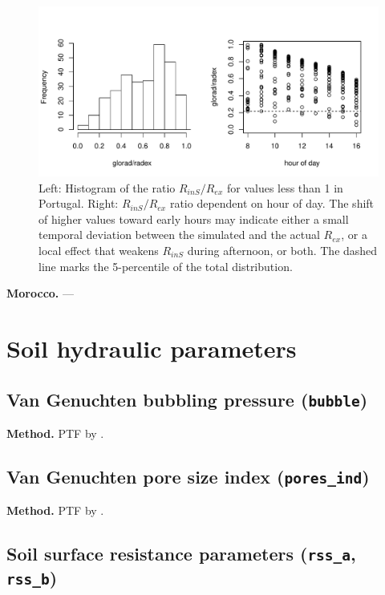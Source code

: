\documentclass{scrreprt}
\begin{document}
\begin{figure}[ht]
  \centering
  \includegraphics[width=0.9\hsize]{./plot_radex.pdf}
  \caption{Left: Histogram of the ratio $R_{inS}/R_{ex}$ for values less than 1 in Portugal.
      Right: $R_{inS}/R_{ex}$ ratio dependent on hour of day.
      The shift of higher values toward early hours may indicate either a small temporal deviation between the simulated and the actual $R_{ex}$, or a local effect that weakens $R_{inS}$ during afternoon, or both.
      The dashed line marks the 5-percentile of the total distribution.}
  \label{fig:portugal_radex}
\end{figure}


\noindent
\textbf{Morocco.}
---

\newpage
\section{Soil hydraulic parameters} \label{sec:parest_soil}

\subsection{Van Genuchten bubbling pressure (\texttt{bubble})} \label{ssec:parest_soil_bubble}

\textbf{Method.}
PTF by \citet{rawls85}.

\newpage
\subsection{Van Genuchten pore size index (\texttt{pores\_ind})} \label{ssec:parest_soil_poresind}

\textbf{Method.}
PTF by \citet{rawls85}.

\newpage
\subsection{Soil surface resistance parameters (\texttt{rss\_a}, \texttt{rss\_b})} \label{ssec:parest_soil_rss}
\end{document}
